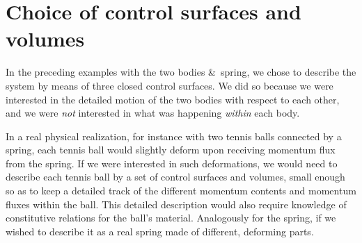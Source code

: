 \documentclass[a4paper,12pt,%
onecolumn,oneside,%
british%
]{memoir}
\newcommand*{\amp}{\&}
\renewcommand*{\|}[1][]{\nonscript\:#1\vert\nonscript\:\mathopen{}}
\begin{document}
\section{Choice of control surfaces and volumes}
\label{sec:momentum_choice_control}

In the preceding examples with the two bodies \amp\ spring, we chose to describe the system by means of three closed control surfaces. We did so because we were interested in the detailed motion of the two bodies with respect to each other, and we were \emph{not} interested in what was happening \emph{within} each body.

In a real physical realization, for instance with two tennis balls connected by a spring, each tennis ball would slightly deform upon receiving momentum flux from the spring. If we were interested in such deformations, we would need to describe each tennis ball by a set of control surfaces and volumes, small enough so as to keep a detailed track of the different momentum contents and momentum fluxes within the ball. This detailed description would also require knowledge of constitutive relations for the ball's material. Analogously for the spring, if we wished to describe it as a real spring made of different, deforming parts.
\end{document}
